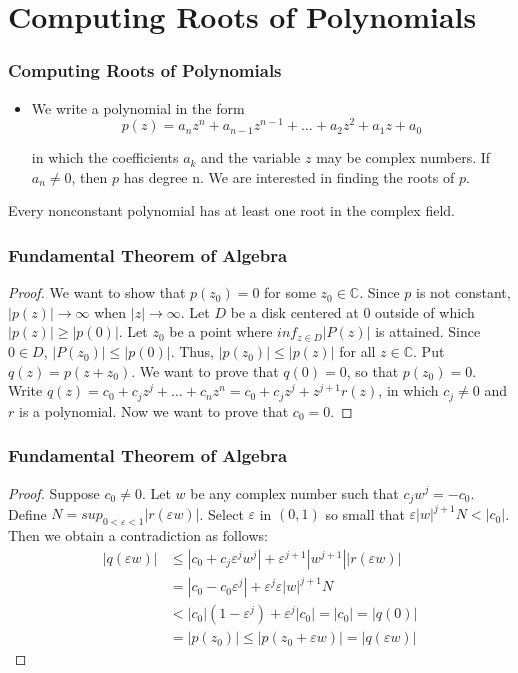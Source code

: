 \documentclass[notheorems,mathserif,table,compress]{beamer}  %
\begin{document}
\section{Computing Roots of Polynomials}

\begin{frame}
\frametitle{Computing Roots of Polynomials}
\begin{itemize}
\item We write a polynomial in the form 
\begin{equation}
p(z)=a_n z^n+a_{n-1}z^{n-1}+\ldots+a_2 z^2+a_1z+a_0
\end{equation}

in which the coefficients $a_k$ and the variable $z$ may be complex numbers. If $a_n\neq0$, then $p$ has \textsf{degree} n. We are interested in finding the roots of $p$.
\end{itemize}
\begin{theorem}
Every nonconstant polynomial has at least one root in the complex field.
\end{theorem}

\end{frame}

\begin{frame}
\frametitle{Fundamental Theorem of Algebra}
\begin{proof}
We want to show that $p(z_0)=0$ for some $z_0\in \mathbb{C}$. Since $p$ is not constant, $|p(z)|\to\infty$ when $|z|\to\infty$. Let $D$ be a disk centered at $0$ outside of which $|p(z)|\geq|p(0)|$. Let $z_0$ be a point where $inf_{z\in D}|P(z)|$ is attained. Since $0\in D$, $|P(z_0)|\leq|p(0)|$. Thus, $|p(z_0)|\leq|p(z)|$ for all $z\in \mathbb{C}$. Put $q(z)=p(z+z_0)$. We want to prove that $q(0)=0$, so that $p(z_0)=0$. Write $q(z)=c_0+c_j z^j+\ldots+c_n z^n=c_0+c_j z^j+z^{j+1}r(z)$, in which $c_j\neq0$ and $r$ is a polynomial. Now we want to prove that $c_0=0$.
\end{proof}
\end{frame}

\begin{frame}
\frametitle{Fundamental Theorem of Algebra}
\begin{proof}
Suppose $c_0\neq0$. Let $w$ be any complex number such that $c_j w^j=-c_0$. Define $N=sup_{0<\varepsilon<1}|r(\varepsilon w)|$. Select $\varepsilon$ in $(0,1)$ so small that $\varepsilon|w|^{j+1}N<|c_0|$. Then we obtain a contradiction as follows:
\begin{equation*}
\begin{split}
|q(\varepsilon w)| & \leq|c_0+c_j \varepsilon^j w^j|+\varepsilon^{j+1}|w^{j+1}||r(\varepsilon w)| \\
                   & =|c_0-c_0\varepsilon^j|+\varepsilon^j\varepsilon|w|^{j+1}N\\
                   & <|c_0|(1-\varepsilon^j)+\varepsilon^j|c_0|=|c_0|=|q(0)|\\
                   & =|p(z_0)|\leq|p(z_0+\varepsilon w)|=|q(\varepsilon w)|
\end{split}
\end{equation*}

\end{proof}
\end{frame}
\end{document}
